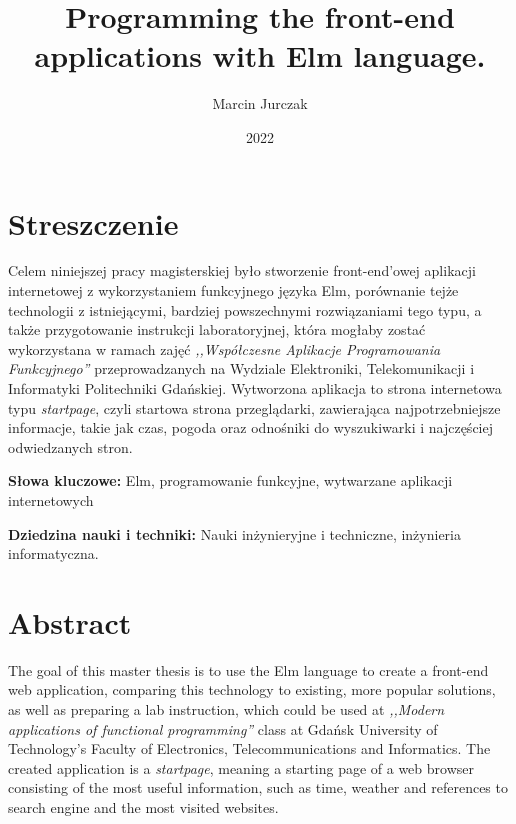 \documentclass[twoside,a4paper]{report}
\begin{document}


\title{Programming the front-end applications with Elm language.}
\author{Marcin Jurczak}
\date{2022}

\maketitle


\chapter*{Streszczenie}
\noindent
Celem niniejszej pracy magisterskiej było stworzenie front-end'owej aplikacji internetowej z wykorzystaniem funkcyjnego języka Elm, porównanie tejże technologii z istniejącymi, bardziej powszechnymi rozwiązaniami tego typu, a także przygotowanie instrukcji laboratoryjnej, która mogłaby zostać wykorzystana w ramach zajęć \textit{,,Współczesne Aplikacje Programowania Funkcyjnego''} przeprowadzanych na Wydziale Elektroniki, Telekomunikacji i Informatyki Politechniki Gdańskiej. Wytworzona aplikacja to strona internetowa typu \textit{startpage}, czyli startowa strona przeglądarki, zawierająca najpotrzebniejsze informacje, takie jak czas, pogoda oraz odnośniki do wyszukiwarki i najczęściej odwiedzanych stron.

\textbf{Słowa kluczowe:} Elm, programowanie funkcyjne, wytwarzane aplikacji internetowych

\textbf{Dziedzina nauki i techniki: }Nauki inżynieryjne i techniczne, inżynieria informatyczna.

{\let\clearpage\relax\chapter*{Abstract}}
\noindent
The goal of this master thesis is to use the Elm language to create a front-end web application, comparing this technology to existing, more popular solutions, as well as preparing a lab instruction, which could be used at \textit{,,Modern applications of functional programming''} class at Gdańsk University of Technology’s Faculty of Electronics, Telecommunications and Informatics. The created application is a \textit{startpage}, meaning a starting page of a web browser consisting of the most useful information, such as time, weather and references to search engine and the most visited websites.
\end{document}
